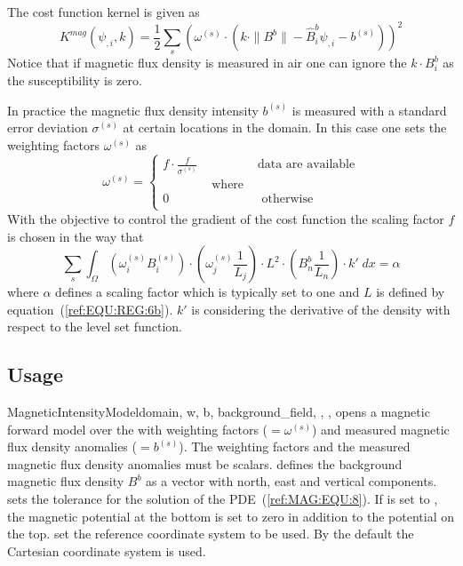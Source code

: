 The cost function kernel is given as
\begin{equation}\label{ref:IMAG:EQU:10}
K^{mag}(\psi_{,i},k) = \frac{1}{2}\sum_{s} \left( \omega^{(s)} \cdot (k \cdot  \|B^{b}\|  -  \hat{B}^{b}_i \psi_{,i} - b^{(s)}) \right)^2
\end{equation} 
Notice that if magnetic flux density is measured in air one can ignore the
$k\cdot B^b_i$ as the susceptibility is zero.

In practice the magnetic flux density intensity $b^{(s)}$ is measured 
with a standard error deviation $\sigma^{(s)}$ at certain locations in the domain.
In this case one sets the weighting
factors $\omega^{(s)}$ as
\begin{equation}\label{ref:IMAG:EQU:11}
\omega^{(s)} 
= \left\{
\begin{array}{lcl}
f \cdot  \frac{f}{\sigma^{(s)}} & & \mbox{data are available} \\
& \mbox{ where } & \\
0 & & \mbox{ otherwise } \\
\end{array}
\right.
\end{equation} 
With the objective to control the 
gradient of the cost function the scaling factor $f$ is chosen in the way that 
\begin{equation}\label{ref:IMAG:EQU:12}
\sum_{s} \int_{\Omega} ( \omega^{(s)}_i B^{(s)}_i ) 
 \cdot ( \omega^{(s)}_j \frac{1}{L_j} ) \cdot L^2 \cdot
( B^b_n \frac{1}{L_n} )
 \cdot k' \;
 dx =\alpha
\end{equation} 
where $\alpha$ defines a scaling factor which is typically set to one and $L$ is defined by equation~(\ref{ref:EQU:REG:6b}).
$k'$ is considering the 
derivative of the density with respect to the level set function. 



\subsection{Usage}

\begin{classdesc}{MagneticIntensityModel}{domain, w, b, background_field,
        ,
        ,
}
opens a magnetic forward model over the \Domain {} with 
weighting factors  ($=\omega^{(s)}$) and measured magnetic flux
density anomalies  ($=b^{(s)}$).
The weighting factors and the  measured magnetic flux density anomalies must be scalars.
 defines the background magnetic flux density $B^b$
as a vector with north, east and vertical components. 
 sets the tolerance for the solution of the PDE~(\ref{ref:MAG:EQU:8}).
If  is set to  \True, the magnetic potential 
at the bottom is set to zero in addition to the potential on the top. 
 set the reference coordinate system to be used. By the default the 
Cartesian coordinate system is used.
\end{classdesc}

